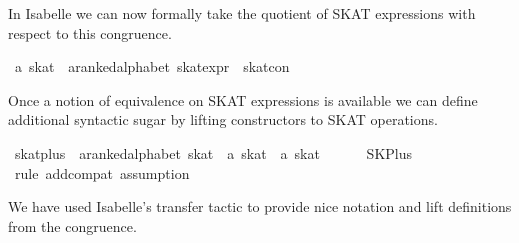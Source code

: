 \documentclass{llncs}
\begin{document}
In Isabelle we can now formally take the quotient of SKAT expressions
with respect to this congruence.

\begin{isabellebody}
\isanewline
{}\isamarkupfalse%
\ {}a\ skat\ {}\ {}{}a{}{}ranked{}alphabet\ skat{}expr{}\ {}\ skat{}con\isanewline
\end{isabellebody}

Once a notion of equivalence on SKAT expressions is available we can
define additional syntactic sugar by lifting constructors to SKAT operations.

\begin{isabellebody}
\isanewline
{}\isamarkupfalse%
\ skat{}plus\ {}{}\ {}{}a{}{}ranked{}alphabet\ skat\ {}\ {}a\ skat\ {}\ {}a\ skat{}
\isanewline\ \ {}\ {}{}{}\ {}{}{}\ \ SKPlus\isanewline
%
\isadelimproof
\ \ %
\endisadelimproof
%
\isatagproof
{}\isamarkupfalse%
\ {}rule\ add{}compat{}\ assumption{}{}%
\endisatagproof\isanewline
\end{isabellebody}

We have used Isabelle's transfer tactic to provide nice notation and lift definitions from the congruence.
\end{document}
